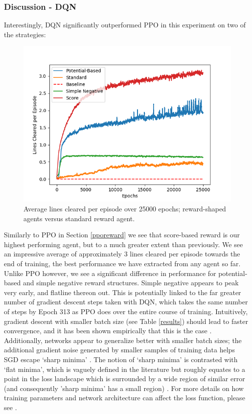 \documentclass[12pt]{article}
\begin{document}
\subsubsection{Discussion - DQN}\label{dqnreward}
Interestingly, DQN significantly outperformed PPO in this experiment on two of the strategies: 
\begin{figure}[H]
    \centering
    \includegraphics[scale=0.7]{29.png}
    \caption{Average lines cleared per episode over 25000 epochs; reward-shaped agents versus standard reward agent.}
\end{figure}
Similarly to PPO in Section \ref{pporeward} we see that score-based reward is our highest performing agent, but to a much greater extent than previously. We see an impressive average of approximately 3 lines cleared per episode towards the end of training, the best performance we have extracted from any agent so far. \\\newline
Unlike PPO however, we see a significant difference in performance for potential-based and simple negative reward structures. Simple negative appears to peak very early, and flatline thereon out. This is potentially linked to the far greater number of gradient descent steps taken with DQN, which takes the same number of steps by Epoch 313 as PPO does over the entire course of training. Intuitively, gradient descent with smaller batch size (see Table \ref{results}) should lead to faster convergence, and it has been shown empirically that this is the case \autocite{DBLP:journals/corr/KeskarMNST16}. Additionally, networks appear to generalize better with smaller batch sizes; the additional gradient noise generated by smaller samples of training data helps SGD escape `sharp minima' \autocite{10.1162/neco.1997.9.1.1}. The notion of `sharp minima' is contrasted with `flat minima', which is vaguely defined in the literature but roughly equates to a point in the loss landscape which is surrounded by a wide region of similar error (and consequently 'sharp minima' has a small region) \autocite{dinh2017sharp}. For more details on how training parameters and network architecture can affect the loss function, please see \autocite{li2018visualizing}. \\\newline
\end{document}
